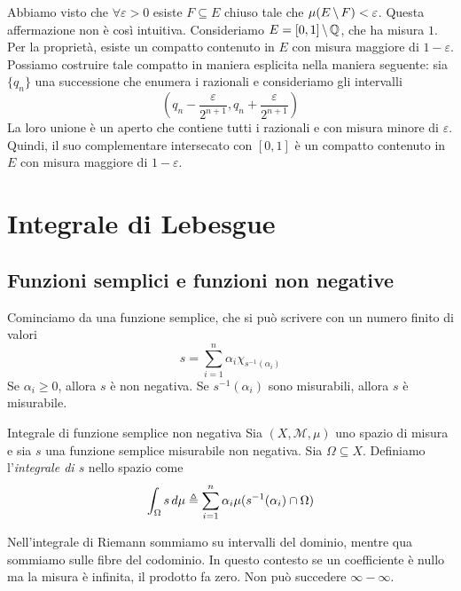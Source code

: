 \documentclass[a4paper]{article}
\begin{document}
\begin{radioactive}
Abbiamo visto che \(\forall \varepsilon > 0\)
esiste \(F \subseteq E\) chiuso tale che \(\mu(E \,\backslash\, F) < \varepsilon\).
Questa affermazione non è così intuitiva.
Consideriamo \(E=[0,1]\,\backslash\,\mathbb{Q}\), che ha misura \(1\).
Per la proprietà, esiste un compatto contenuto in \(E\)
con misura maggiore di \(1-\varepsilon\).
Possiamo costruire tale compatto in maniera esplicita
nella maniera seguente:
sia \(\{q_n\}\) una successione che enumera i razionali
e consideriamo gli intervalli
\[
    \left(
        q_n - \frac{\varepsilon}{2^{n+1}},
        q_n + \frac{\varepsilon}{2^{n+1}}
    \right)
\]
La loro unione è un aperto che contiene tutti i razionali e con misura minore di \(\varepsilon\).
Quindi, il suo complementare intersecato con \([0,1]\) è un compatto
contenuto in \(E\) con misura maggiore di \(1-\varepsilon\).
\end{radioactive}

\section{Integrale di Lebesgue}

\subsection{Funzioni semplici e funzioni non negative}

\begin{radioactive}
Cominciamo da una funzione semplice, che si può scrivere con un numero finito di valori
\[
    s = \sum_{i=1}^n \alpha_i \chi_{s^{-1}(\alpha_i)}
\]
Se \(\alpha_i \geq 0\), allora \(s\) è non negativa.
Se \(s^{-1}(\alpha_i)\) sono misurabili, allora \(s\) è misurabile.
\end{radioactive}

\begin{radioactive}
\begin{snippetdefinition}{Integrale di funzione semplice non negativa}
    Sia \((X, \mathcal M, \mu)\) uno spazio di misura e sia
    \(s\) una funzione semplice misurabile non negativa. Sia \(\Omega \subseteq X\).
    Definiamo l'\emph{integrale di \(s\)} nello spazio come
    \[
        \int_\Omega s\,d\mu \triangleq
        \sum_{i=1}^n \alpha_i \mu(s^{-1}(\alpha_i) \cap \Omega)
    \]
\end{snippetdefinition}
\end{radioactive}

\begin{radioactive}
Nell'integrale di Riemann sommiamo su intervalli del dominio,
mentre qua sommiamo sulle fibre del codominio.
In questo contesto se un coefficiente è nullo ma la misura
è infinita, il prodotto fa zero. Non può succedere \(\infty-\infty\).
\end{radioactive}
\end{document}
